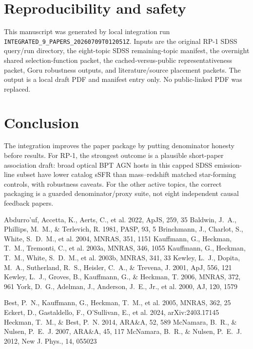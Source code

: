 \documentclass[twocolumn]{aastex631}
\begin{document}
\section{Reproducibility and safety}\label{sec:repro}
This manuscript was generated by local integration run \texttt{INTEGRATED\_9\_PAPERS\_20260709T012051Z}. Inputs are the original RP-1 SDSS query/run directory, the eight-topic SDSS remaining-topic manifest, the overnight shared selection-function packet, the cached-versus-public representativeness packet, Goru robustness outputs, and literature/source placement packets. The output is a local draft PDF and manifest entry only. No public-linked PDF was replaced.

\section{Conclusion}\label{sec:conclusion}
The integration improves the paper package by putting denominator honesty before results. For RP-1, the strongest outcome is a plausible short-paper association draft: broad optical BPT AGN hosts in this capped SDSS emission-line subset have lower catalog sSFR than mass--redshift matched star-forming controls, with robustness caveats. For the other active topics, the correct packaging is a guarded denominator/proxy suite, not eight independent causal feedback papers.


\begin{thebibliography}{}
 Abdurro'uf, Accetta, K., Aerts, C., et al. 2022, ApJS, 259, 35
 Baldwin, J.~A., Phillips, M.~M., \& Terlevich, R. 1981, PASP, 93, 5
 Brinchmann, J., Charlot, S., White, S.~D.~M., et al. 2004, MNRAS, 351, 1151
 Kauffmann, G., Heckman, T.~M., Tremonti, C., et al. 2003a, MNRAS, 346, 1055
 Kauffmann, G., Heckman, T.~M., White, S.~D.~M., et al. 2003b, MNRAS, 341, 33
 Kewley, L.~J., Dopita, M.~A., Sutherland, R.~S., Heisler, C.~A., \& Trevena, J. 2001, ApJ, 556, 121
 Kewley, L.~J., Groves, B., Kauffmann, G., \& Heckman, T. 2006, MNRAS, 372, 961
 York, D.~G., Adelman, J., Anderson, J.~E., Jr., et al. 2000, AJ, 120, 1579

 Best, P.~N., Kauffmann, G., Heckman, T.~M., et al. 2005, MNRAS, 362, 25
 Eckert, D., Gastaldello, F., O'Sullivan, E., et al. 2024, arXiv:2403.17145
 Heckman, T.~M., \& Best, P.~N. 2014, ARA\&A, 52, 589
 McNamara, B.~R., \& Nulsen, P.~E.~J. 2007, ARA\&A, 45, 117
 McNamara, B.~R., \& Nulsen, P.~E.~J. 2012, New J. Phys., 14, 055023
\end{thebibliography}
\end{document}
